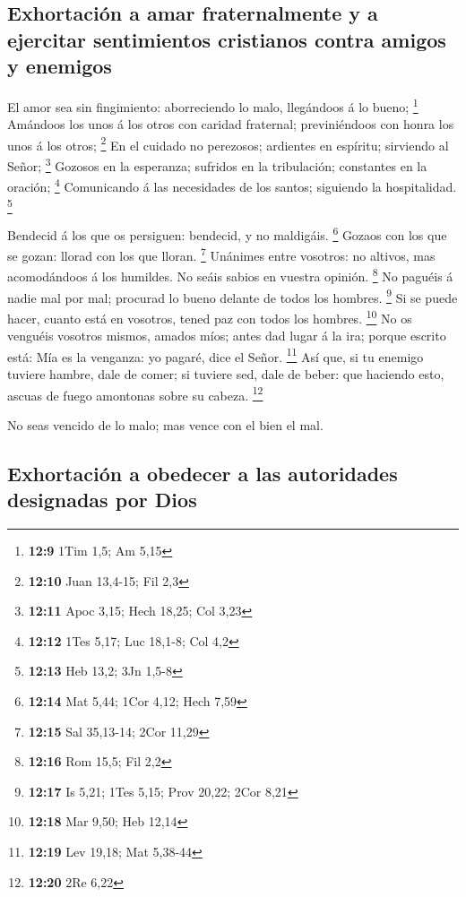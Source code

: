 \hypertarget{exhortaciuxf3n-a-amar-fraternalmente-y-a-ejercitar-sentimientos-cristianos-contra-amigos-y-enemigos}{%
\subsection{Exhortación a amar fraternalmente y a ejercitar sentimientos
cristianos contra amigos y
enemigos}\label{exhortaciuxf3n-a-amar-fraternalmente-y-a-ejercitar-sentimientos-cristianos-contra-amigos-y-enemigos}}

 El amor sea sin fingimiento: aborreciendo lo malo,
llegándoos á lo bueno; \footnote{\textbf{12:9} 1Tim 1,5; Am 5,15}
 Amándoos los unos á los otros con caridad fraternal;
previniéndoos con honra los unos á los otros; \footnote{\textbf{12:10}
  Juan 13,4-15; Fil 2,3}  En el cuidado no perezosos;
ardientes en espíritu; sirviendo al Señor; \footnote{\textbf{12:11} Apoc
  3,15; Hech 18,25; Col 3,23}  Gozosos en la esperanza;
sufridos en la tribulación; constantes en la oración; \footnote{\textbf{12:12}
  1Tes 5,17; Luc 18,1-8; Col 4,2}  Comunicando á las
necesidades de los santos; siguiendo la hospitalidad. \footnote{\textbf{12:13}
  Heb 13,2; 3Jn 1,5-8}

 Bendecid á los que os persiguen: bendecid, y no maldigáis.
\footnote{\textbf{12:14} Mat 5,44; 1Cor 4,12; Hech 7,59} 
Gozaos con los que se gozan: llorad con los que lloran. \footnote{\textbf{12:15}
  Sal 35,13-14; 2Cor 11,29}  Unánimes entre vosotros: no
altivos, mas acomodándoos á los humildes. No seáis sabios en vuestra
opinión. \footnote{\textbf{12:16} Rom 15,5; Fil 2,2}  No
paguéis á nadie mal por mal; procurad lo bueno delante de todos los
hombres. \footnote{\textbf{12:17} Is 5,21; 1Tes 5,15; Prov 20,22; 2Cor
  8,21}  Si se puede hacer, cuanto está en vosotros, tened
paz con todos los hombres. \footnote{\textbf{12:18} Mar 9,50; Heb 12,14}
 No os venguéis vosotros mismos, amados míos; antes dad
lugar á la ira; porque escrito está: Mía es la venganza: yo pagaré, dice
el Señor. \footnote{\textbf{12:19} Lev 19,18; Mat 5,38-44} 
Así que, si tu enemigo tuviere hambre, dale de comer; si tuviere sed,
dale de beber: que haciendo esto, ascuas de fuego amontonas sobre su
cabeza. \footnote{\textbf{12:20} 2Re 6,22}

 No seas vencido de lo malo; mas vence con el bien el mal.

\hypertarget{exhortaciuxf3n-a-obedecer-a-las-autoridades-designadas-por-dios}{%
\subsection{Exhortación a obedecer a las autoridades designadas por
Dios}\label{exhortaciuxf3n-a-obedecer-a-las-autoridades-designadas-por-dios}}

